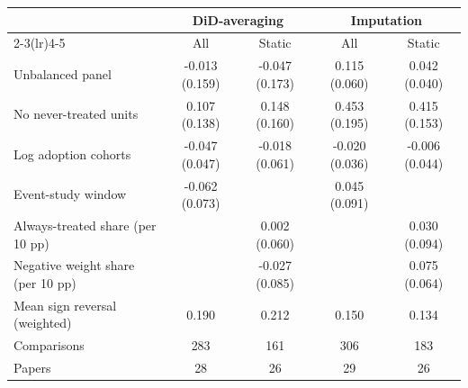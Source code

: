 \begin{tabular}{lcccc}
\toprule
 & \multicolumn{2}{c}{DiD-averaging} & \multicolumn{2}{c}{Imputation} \\
\cmidrule(lr){2-3}\cmidrule(lr){4-5}
 & All & Static & All & Static \\
\midrule
Unbalanced panel & -0.013 (0.159) & -0.047 (0.173) & 0.115 (0.060) & 0.042 (0.040) \\
No never-treated units & 0.107 (0.138) & 0.148 (0.160) & 0.453 (0.195) & 0.415 (0.153) \\
Log adoption cohorts & -0.047 (0.047) & -0.018 (0.061) & -0.020 (0.036) & -0.006 (0.044) \\
Event-study window & -0.062 (0.073) &  & 0.045 (0.091) &  \\
Always-treated share (per 10 pp) &  & 0.002 (0.060) &  & 0.030 (0.094) \\
Negative weight share (per 10 pp) &  & -0.027 (0.085) &  & 0.075 (0.064) \\
\midrule
Mean sign reversal (weighted) & 0.190 & 0.212 & 0.150 & 0.134 \\
Comparisons & 283 & 161 & 306 & 183 \\
Papers & 28 & 26 & 29 & 26 \\
\bottomrule
\end{tabular}
